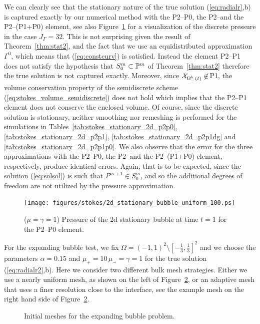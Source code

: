We can clearly see that the stationary nature of the true solution
(\ref{eq:radialr},b) is captured exactly by our numerical method with the
P2--P0, the P2--\pdg and the P2--(P1+P0) element, see also
Figure~\ref{fig:2d_stationary_bubble} for a visualization of the discrete
pressure in the case $J_\Gamma = 32$. This is not surprising given the
result of Theorem~\ref{thm:stat2}, and the fact that we use an equidistributed
approximation $\Gamma^0$, which means that (\ref{eq:constcurv}) is satisfied.
Instead the element P2--P1 does not satisfy the hypothesis that $S^m_0 \subset
\mathbb{P}^m$ of Theorem~\ref{thm:stat2} therefore the true solution is not
captured exactly. Moreover, since $\mathrm{\mathcal{X}}_{\Omega_-^h(t)}\not\in\,$P1, the
volume conservation property of the semidiscrete scheme
(\ref{eq:stokes_volume_semidiscrete}) does not hold which implies that the
P2--P1 element does not conserve the enclosed volume. Of course, since the
discrete solution is stationary, neither smoothing nor remeshing is performed
for the simulations in Tables~\ref{tab:stokes_stationary_2d_p2p0},
\ref{tab:stokes_stationary_2d_p2p1}, \ref{tab:stokes_stationary_2d_p2p1dg} and
\ref{tab:stokes_stationary_2d_p2p1p0}. We also observe that the error for the
three approximations with the P2--P0, the P2--\pdg and the P2--(P1+P0)
element, respectively, produce identical errors. Again, that is to be expected,
since the solution (\ref{eq:solsol}) is such that $P^{m+1} \in S^m_0$, and so
the additional degrees of freedom are not utilized by the pressure
approximation.
\begin{figure}[htbp]
\centering
\texttt{[image: figures/stokes/2d\_stationary\_bubble\_uniform\_100.ps]}
\caption[Stokes 2d stationary bubble pressure]
{($\mu=\gamma=1$) Pressure of the 2d stationary bubble at time $t=1$
for the P2--P0 element.}
\label{fig:2d_stationary_bubble}
\end{figure}

For the expanding bubble test, we fix $\Omega = (-1,1)^2 \setminus
[-\frac13,\frac13]^2$ and we choose the parameters $\alpha = 0.15$ and $\mu_+ =
10\,\mu_- = \gamma = 1$ for the true solution (\ref{eq:radialr2},b). Here we
consider two different bulk mesh strategies. Either we use a nearly uniform
mesh, as shown on the left of Figure~\ref{fig:meshes_expanding}, or an adaptive
mesh that uses a finer resolution close to the interface, see the example mesh
on the right hand side of Figure~\ref{fig:meshes_expanding}.
\begin{figure}[htbp]
\centering
{}
\caption[Stokes 2d expanding bubble initial meshes]
{Initial meshes for the expanding bubble problem.}
\label{fig:meshes_expanding}
\end{figure}

